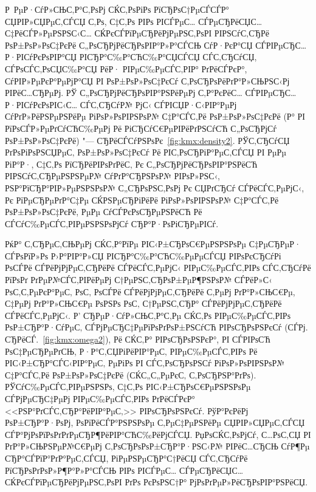 \begin{enumerate}
Р РµР·СѓР»СЊС‚Р°С‚РѕРј СЌС‚РѕРіРѕ РїСЂРѕС†РµСЃСЃР° СЏРІР»СЏРµС‚СЃСЏ С‚Рѕ, С‡С‚Рѕ РІРѕ РІСЃРµС… СЃРµСЂРёСЏС…
С‡РёСЃР»РµРЅРЅС‹С… СЌРєСЃРїРµСЂРёРјРµРЅС‚РѕРІ РІРЅСѓС‚СЂРё РѕР±РѕР»РѕС‡РєРё С„РѕСЂРјРёСЂРѕРІР°Р»Р°СЃСЊ СѓР·РєР°СЏ
СЃРІРµСЂС…Р·РІСѓРєРѕРІР°СЏ РІСЂР°С‰Р°СЋС‰Р°СЏСЃСЏ СЃС‚СЂСѓСЏ, СЃРѕСЃС‚РѕСЏС‰Р°СЏ РёР· РІРµС‰РµСЃС‚РІР° РґРёСЃРєР°,
СѓРІР»РµРєР°РµРјР°СЏ РІ РѕР±РѕР»РѕС‡РєСѓ С‚РѕСЂРѕРёРґР°Р»СЊРЅС‹Рј РІРёС…СЂРµРј. РЎ С„РѕСЂРјРёСЂРѕРІР°РЅРёРµРј С‚Р°РєРёС…
СЃРІРµСЂС…Р·РІСѓРєРѕРІС‹С… СЃС‚СЂСѓР№ РјС‹ СЃРІСЏР·С‹РІР°РµРј СѓРґР»РёРЅРµРЅРёРµ РіРѕР»РѕРІРЅРѕР№ С‡Р°СЃС‚Рё РѕР±РѕР»РѕС‡РєРё
(Р° РІ РїРѕСЃР»РµРґСѓСЋС‰РµРј Рё РіСЂСѓС€РµРІРёРґРЅСѓСЋ С„РѕСЂРјСѓ РѕР±РѕР»РѕС‡РєРё) "---
СЂРёСЃСѓРЅРѕРє~\ref{fig:kmx:density2}. РЎС‚СЂСѓСЏ РґРѕРіРѕРЅСЏРµС‚ РѕР±РѕР»РѕС‡РєСѓ Рё РІС‚РѕСЂРіР°РµС‚СЃСЏ РІ РµРµ РіР°Р·,
С‡С‚Рѕ РїСЂРёРІРѕРґРёС‚ Рє С„РѕСЂРјРёСЂРѕРІР°РЅРёСЋ РІРЅСѓС‚СЂРµРЅРЅРµР№ СѓРґР°СЂРЅРѕР№ РІРѕР»РЅС‹, РЅР°РїСЂР°РІР»РµРЅРЅРѕР№
С„СЂРѕРЅС‚РѕРј Рє СЏРґСЂСѓ СЃРёСЃС‚РµРјС‹, Рє РїРµСЂРµРґР°С‡Рµ СЌРЅРµСЂРіРёРё РіРѕР»РѕРІРЅРѕР№ С‡Р°СЃС‚Рё РѕР±РѕР»РѕС‡РєРё,
РµРµ СѓСЃРєРѕСЂРµРЅРёСЋ Рё СЃСѓС‰РµСЃС‚РІРµРЅРЅРѕРјСѓ СЂР°Р·РѕРіСЂРµРІСѓ.

РќР° С‚СЂРµС‚СЊРµРј СЌС‚Р°РїРµ РІС‹Р±СЂРѕС€РµРЅРЅРѕРµ С‡РµСЂРµР· СЃРѕРїР»Рѕ Р›Р°РІР°Р»СЏ
РІСЂР°С‰Р°СЋС‰РµРµСЃСЏ РІРѕРєСЂСѓРі РѕСЃРё СЃРёРјРјРµС‚СЂРёРё СЃРёСЃС‚РµРјС‹ РІРµС‰РµСЃС‚РІРѕ СЃС‚СЂСѓРё РїРѕРґ
РґРµР№СЃС‚РІРёРµРј С†РµРЅС‚СЂРѕР±РµР¶РЅРѕР№ СЃРёР»С‹ РѕС‚С‚РµРєР°РµС‚ РѕС‚ РѕСЃРё СЃРёРјРјРµС‚СЂРёРё С‚РµРј РґР°Р»СЊС€Рµ,
С‡РµРј РґР°Р»СЊС€Рµ РѕРЅРѕ РѕС‚ С†РµРЅС‚СЂР° СЃРёРјРјРµС‚СЂРёРё СЃРёСЃС‚РµРјС‹. Р’ СЂРµР·СѓР»СЊС‚Р°С‚Рµ СЌС‚Рѕ РІРµС‰РµСЃС‚РІРѕ
РѕР±СЂР°Р·СѓРµС‚ СЃРјРµСЂС‡РµРїРѕРґРѕР±РЅСѓСЋ РІРѕСЂРѕРЅРєСѓ (СЃРј. СЂРёСЃ.~\ref{fig:kmx:omega2}), Рё СЌС‚Р° РІРѕСЂРѕРЅРєР°,
РІ СЃРІРѕСЋ РѕС‡РµСЂРµРґСЊ, Р·Р°С‚СЏРіРёРІР°РµС‚ РІРµС‰РµСЃС‚РІРѕ Рё РІС‹Р±СЂР°СЃС‹РІР°РµС‚ РµРіРѕ РІ СЃС‚РѕСЂРѕРЅСѓ
РіРѕР»РѕРІРЅРѕР№ С‡Р°СЃС‚Рё РѕР±РѕР»РѕС‡РєРё (СЌС„С„РµРєС‚ С‚РѕСЂРЅР°РґРѕ). РЎСѓС‰РµСЃС‚РІРµРЅРЅРѕ, С‡С‚Рѕ РІС‹Р±СЂРѕС€РµРЅРЅРѕРµ
СЃРјРµСЂС‡РµРј РІРµС‰РµСЃС‚РІРѕ РґРёСЃРєР° <<РЅР°РґСЃС‚СЂР°РёРІР°РµС‚>> РІРѕСЂРѕРЅРєСѓ. РўР°РєРёРј РѕР±СЂР°Р·РѕРј, РѕРїРёСЃР°РЅРЅРѕРµ
С‚РµС‡РµРЅРёРµ СЏРІР»СЏРµС‚СЃСЏ СЃР°РјРѕРїРѕРґРґРµСЂР¶РёРІР°СЋС‰РёРјСЃСЏ. РџРѕСЌС‚РѕРјСѓ, С…РѕС‚СЏ РІ РґР°Р»СЊРЅРµР№С€РµРј
С‚РѕСЂРѕРѕР±СЂР°Р·РЅС‹Р№ РІРёС…СЂСЊ СѓР¶Рµ СЂР°СЃРїР°РґР°РµС‚СЃСЏ, РіРµРЅРµСЂР°С†РёСЏ СЃС‚СЂСѓРё РїСЂРѕРґРѕР»Р¶Р°Р»Р°СЃСЊ
РІРѕ РІСЃРµС… СЃРµСЂРёСЏС… СЌРєСЃРїРµСЂРёРјРµРЅС‚РѕРІ РґРѕ РєРѕРЅС†Р° РјРѕРґРµР»РёСЂРѕРІР°РЅРёСЏ.




\end{enumerate}
